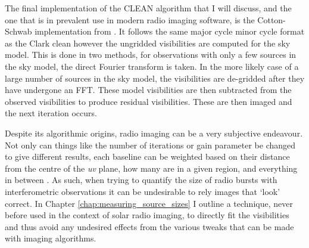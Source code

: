 The final implementation of the CLEAN algorithm that I will discuss, and the one that is in prevalent use in modern radio imaging software, is the Cotton-Schwab implementation from \cite{Schwab1984}. It follows the same major cycle minor cycle format as the Clark clean however the ungridded visibilities are computed for the sky model. This is done in two methods, for observations with only a few sources in the sky model, the direct Fourier transform is taken. In the more likely case of a large number of sources in the sky model, the visibilities are de-gridded after they have undergone an FFT. These model visibilities are then subtracted from the observed visibilities to produce residual visibilities. These are then imaged and the next iteration occurs.

Despite its algorithmic origins, radio imaging can be a very subjective endeavour. Not only can things like the number of iterations or gain parameter be changed to give different results, each baseline can be weighted based on their distance from the centre of the \textit{uv} plane, how many are in a given region, and everything in between \citep{Briggs1995}. As such, when trying to quantify the size of radio bursts with interferometric observations it can be undesirable to rely images that `look' correct. In Chapter \ref{chap:measuring_source_sizes} I outline a technique, never before used in the context of solar radio imaging, to directly fit the visibilities and thus avoid any undesired effects from the various tweaks that can be made with imaging algorithms.